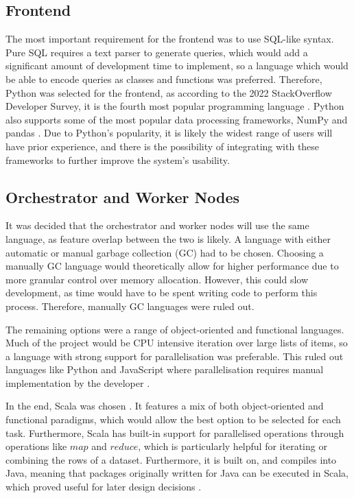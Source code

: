 \subsection{Frontend}\label{subsec:frontend-design}
The most important requirement for the frontend was to use SQL-like syntax. Pure SQL requires a text parser to generate queries, which would add a significant amount of development time to implement, so a language which would be able to encode queries as classes and functions was preferred. Therefore, Python was selected for the frontend, as according to the 2022 StackOverflow Developer Survey, it is the fourth most popular programming language \cite{stackoverflowsurvey2022}. Python also supports some of the most popular data processing frameworks, NumPy and pandas \cite{reback2020pandas, harris2020array}. Due to Python's popularity, it is likely the widest range of users will have prior experience, and there is the possibility of integrating with these frameworks to further improve the system's usability. 

\subsection{Orchestrator and Worker Nodes}
It was decided that the orchestrator and worker nodes will use the same language, as feature overlap between the two is likely. A language with either automatic or manual garbage collection (GC) had to be chosen. Choosing a manually GC language would theoretically allow for higher performance due to more granular control over memory allocation. However, this could slow development, as time would have to be spent writing code to perform this process. Therefore, manually GC languages were ruled out.

The remaining options were a range of object-oriented and functional languages. Much of the project would be CPU intensive iteration over large lists of items, so a language with strong support for parallelisation was preferable. This ruled out languages like Python and JavaScript where parallelisation requires manual implementation by the developer \cite{pythonmultiprocessing, nodeworkerthreads}.

In the end, Scala was chosen \cite{scaladocs}. It features a mix of both object-oriented and functional paradigms, which would allow the best option to be selected for each task. Furthermore, Scala has built-in support for parallelised operations through operations like $map$ and $reduce$, which is particularly helpful for iterating or combining the rows of a dataset. Furthermore, it is built on, and compiles into Java, meaning that packages originally written for Java can be executed in Scala, which proved useful for later design decisions \cite{scalaforjavadevs}.
 
